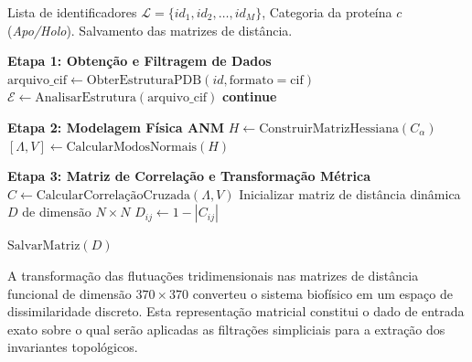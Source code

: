 \documentclass[12pt, a4paper]{article}
\theoremstyle{plain}
\theoremstyle{definition}
\theoremstyle{remark}
\newcommand{\ident}{\hspace{2em}}
\begin{document}
\begin{algorithm}[H]
\caption{Fluxo Computacional para Extração da Matriz de Distância Dinâmica}
\label{alg:anm_pipeline}
\begin{algorithmic}[1]
\Require Lista de identificadores $\mathcal{L} = \{id_1, id_2, \dots, id_M\}$, Categoria da proteína $c$ (\textit{Apo/Holo}).
\Ensure Salvamento das matrizes de distância.

    \State \textbf{Etapa 1: Obtenção e Filtragem de Dados}
    \State $\text{arquivo\_cif} \leftarrow \text{ObterEstruturaPDB}(id, \text{formato}=\text{cif})$
    \State $\mathcal{E} \leftarrow \text{AnalisarEstrutura}(\text{arquivo\_cif})$
        \State \textbf{continue} 
    \EndIf

    \State \textbf{Etapa 2: Modelagem Física ANM}
    \State $H \leftarrow \text{ConstruirMatrizHessiana}(C_\alpha)$
    \State $[\Lambda, V] \leftarrow \text{CalcularModosNormais}(H)$
\EndFor %

    \State \textbf{Etapa 3: Matriz de Correlação e Transformação Métrica}
    \State $C \leftarrow \text{CalcularCorrelaçãoCruzada}(\Lambda, V)$ 
    \State Inicializar matriz de distância dinâmica $D$ de dimensão $N \times N$
            \State $D_{ij} \leftarrow 1 - |C_{ij}|$
        \EndFor
    \EndFor
    
    \State $\text{SalvarMatriz}(D)$
\EndFor
\end{algorithmic}
\end{algorithm}

\ident A transformação das flutuações tridimensionais nas matrizes de distância funcional de dimensão $370 \times 370$ converteu o sistema biofísico em um espaço de dissimilaridade discreto. Esta representação matricial constitui o dado de entrada exato sobre o qual serão aplicadas as filtrações simpliciais para a extração dos invariantes topológicos.
\end{document}
